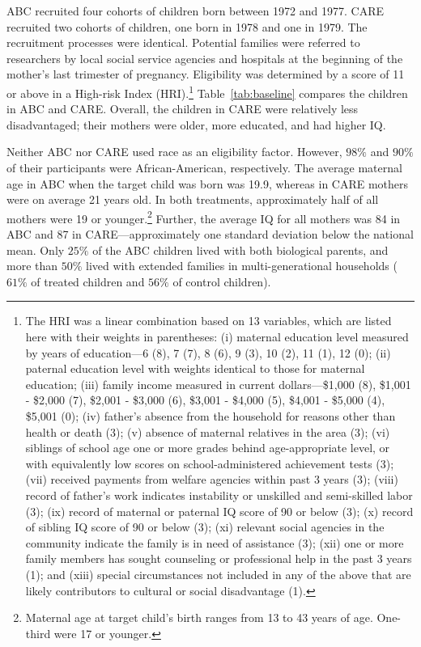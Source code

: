 \noindent ABC recruited four cohorts of children born between 1972 and 1977. CARE recruited two cohorts of children, one born in 1978 and one in 1979. The recruitment processes were identical. Potential families were referred to researchers by local social service agencies and hospitals at the beginning of the mother's last trimester of pregnancy. Eligibility was determined by a score of 11 or above in a High-risk Index (HRI).\footnote{The HRI was a linear combination based on 13 variables, which are listed here with their weights in parentheses: (i) maternal education level measured by years of education---6 (8), 7 (7), 8 (6), 9 (3), 10 (2), 11 (1), 12 (0); (ii) paternal education level with weights identical to those for maternal education; (iii) family income measured in current dollars---\$1,000 (8), \$1,001 - \$2,000 (7), \$2,001 - \$3,000 (6), \$3,001 - \$4,000 (5), \$4,001 - \$5,000 (4), \$5,001 (0); (iv) father's absence from the household for reasons other than health or death (3); (v) absence of maternal relatives in the area (3); (vi) siblings of school age one or more grades behind age-appropriate level, or with equivalently low scores on school-administered achievement tests (3); (vii) received payments from welfare agencies within past 3 years (3); (viii) record of father's work indicates instability or unskilled and semi-skilled labor (3); (ix) record of maternal or paternal IQ score of 90 or below (3); (x) record of sibling IQ score of 90 or below (3); (xi) relevant social agencies in the community indicate the family is in need of assistance (3); (xii) one or more family members has sought counseling or professional help in the past 3 years (1); and (xiii) special circumstances not included in any of the above that are likely contributors to cultural or social disadvantage (1).} Table~\ref{tab:baseline} compares the children in ABC and CARE. Overall, the children in CARE were relatively less disadvantaged; their mothers were older, more educated, and had higher IQ.



\noindent Neither ABC nor CARE used race as an eligibility factor. However, $98\%$ and $90\%$ of their participants were African-American, respectively. The average maternal age in ABC when the target child was born was 19.9, whereas in CARE mothers were on average 21 years old. In both treatments, approximately half of all mothers were 19 or younger.\footnote{Maternal age at target child's birth ranges from 13 to 43 years of age. One-third were 17 or younger.} Further, the average IQ for all mothers was 84 in ABC and 87 in CARE---approximately one standard deviation below the national mean. Only $25\%$ of the ABC children lived with both biological parents, and more than $50\%$ lived with extended families in multi-generational households ($61\%$ of treated children and $56\%$ of control children).\\

